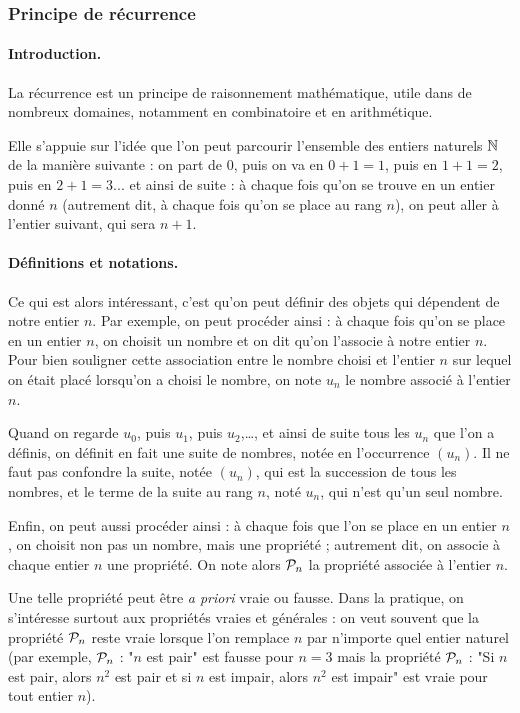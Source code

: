 \subsubsection{Principe de r\'ecurrence}


\paragraph{Introduction.}
La r\'ecurrence est un principe de raisonnement math\'ematique, utile dans de nombreux domaines, notamment en combinatoire et en arithm\'etique.

Elle s'appuie sur l'id\'ee que l'on peut parcourir l'ensemble des entiers naturels $\mathbb{N}$ de la mani\`ere suivante : 
on part de $0$, puis on va en $0+1=1$, puis en $1+1=2$, puis en $2+1=3$... 
et ainsi de suite : \`a  chaque fois qu'on se trouve en un entier donn\'e $n$ (autrement dit, \`a  chaque fois qu'on se place au rang $n$), on peut aller \`a  l'entier suivant, qui sera $n+1$.

\paragraph{D\'efinitions et notations.}
Ce qui est alors int\'eressant, c'est qu'on peut d\'efinir des objets qui d\'ependent de notre entier $n$. Par exemple, on peut proc\'eder ainsi : \`a  chaque fois qu'on se place en un entier $n$, on choisit un nombre et on dit qu'on l'associe \`a  notre entier $n$. Pour bien souligner cette association entre le nombre choisi et l'entier $n$ sur lequel on \'etait plac\'e lorsqu'on a choisi le nombre, on note $u_n$ le nombre associ\'e \`a  l'entier $n$.

Quand on regarde $u_0$, puis $u_1$, puis $u_2$,\ldots, et ainsi de suite tous les $u_n$ que l'on a d\'efinis, on d\'efinit en fait une suite de nombres, not\'ee en l'occurrence $(u_n)$. Il ne faut pas confondre la suite, not\'ee $(u_n)$, qui est la succession de tous les nombres, et le terme de la suite au rang $n$, not\'e $u_n$, qui n'est qu'un seul nombre.

Enfin, on peut aussi proc\'eder ainsi : \`a  chaque fois que l'on se place en un entier $n$, on choisit non pas un nombre, mais une propri\'et\'e ; autrement dit, on associe \`a  chaque entier $n$ une propri\'et\'e. On note alors ${\cal P}_n$ la propri\'et\'e associ\'ee \`a  l'entier $n$.

Une telle propri\'et\'e peut \^etre {\it a priori} vraie ou fausse. Dans la pratique, on s'int\'eresse surtout aux propri\'et\'es vraies et g\'en\'erales : on veut souvent que la propri\'et\'e ${\cal P}_n$ reste vraie lorsque l'on remplace $n$ par n'importe quel entier naturel (par exemple, ${\cal P}_n$ : "$n$ est pair" est fausse pour $n=3$ mais la propri\'et\'e ${\cal P}_n$ : "Si $n$ est pair, alors $n^2$ est pair et si $n$ est impair, alors $n^2$ est impair" est vraie pour tout entier $n$).

